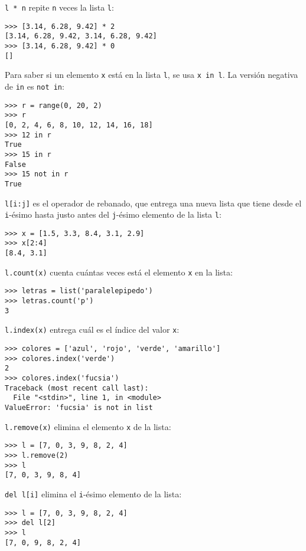 \lstinline!l * n! repite \lstinline!n! veces la lista \lstinline!l!:

\begin{lstlisting}
>>> [3.14, 6.28, 9.42] * 2
[3.14, 6.28, 9.42, 3.14, 6.28, 9.42]
>>> [3.14, 6.28, 9.42] * 0
[]
\end{lstlisting}

Para saber si un elemento \lstinline!x! está en la lista \lstinline!l!,
se usa \lstinline!x in l!. La versión negativa de \lstinline!in! es
\lstinline!not in!:

\begin{lstlisting}
>>> r = range(0, 20, 2)
>>> r
[0, 2, 4, 6, 8, 10, 12, 14, 16, 18]
>>> 12 in r
True
>>> 15 in r
False
>>> 15 not in r
True
\end{lstlisting}

\lstinline!l[i:j]! es el operador de rebanado, que entrega una nueva
lista que tiene desde el \lstinline!i!-ésimo hasta justo antes del
\lstinline!j!-ésimo elemento de la lista \lstinline!l!:

\begin{lstlisting}
>>> x = [1.5, 3.3, 8.4, 3.1, 2.9]
>>> x[2:4]
[8.4, 3.1]
\end{lstlisting}

\lstinline!l.count(x)! cuenta cuántas veces está el elemento
\lstinline!x! en la lista:

\begin{lstlisting}
>>> letras = list('paralelepipedo')
>>> letras.count('p')
3
\end{lstlisting}

\lstinline!l.index(x)! entrega cuál es el índice del valor
\lstinline!x!:

\begin{lstlisting}
>>> colores = ['azul', 'rojo', 'verde', 'amarillo']
>>> colores.index('verde')
2
>>> colores.index('fucsia')
Traceback (most recent call last):
  File "<stdin>", line 1, in <module>
ValueError: 'fucsia' is not in list
\end{lstlisting}

\lstinline!l.remove(x)! elimina el elemento \lstinline!x! de la lista:

\begin{lstlisting}
>>> l = [7, 0, 3, 9, 8, 2, 4]
>>> l.remove(2)
>>> l
[7, 0, 3, 9, 8, 4]
\end{lstlisting}

\lstinline!del l[i]! elimina el \lstinline!i!-ésimo elemento de la
lista:

\begin{lstlisting}
>>> l = [7, 0, 3, 9, 8, 2, 4]
>>> del l[2]
>>> l
[7, 0, 9, 8, 2, 4]
\end{lstlisting}

